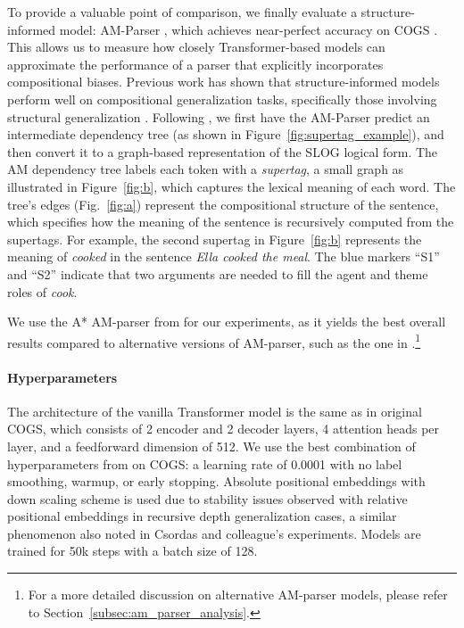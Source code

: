 To provide a valuable point of comparison, we finally evaluate a structure-informed model: AM-Parser \citep{groschwitz-etal-2018-amr}, which achieves near-perfect accuracy on COGS \citep{weissenhorn-etal-2022-compositional}. This allows us to measure how closely Transformer-based models can approximate the performance of a parser that explicitly incorporates compositional biases. Previous work has shown that structure-informed models perform well on compositional generalization tasks, specifically those involving structural generalization \citep{yao-koller-2022-structural}. Following \citet{weissenhorn-etal-2022-compositional}, we first have the AM-Parser predict an intermediate dependency tree (as shown in Figure~\ref{fig:supertag_example}), and then convert it to a graph-based representation of the SLOG logical form. The AM dependency tree labels each token with a \emph{supertag}, a small graph as illustrated in Figure~\ref{fig:b}, which captures the lexical meaning of each word. The tree's edges (Fig.~\ref{fig:a}) represent the compositional structure of the sentence, which specifies how the meaning of the sentence is recursively computed from the supertags.
For example, the second supertag in Figure~\ref{fig:b} represents the meaning of \textit{cooked} in the sentence \textit{Ella cooked the meal}. The blue markers ``S1'' and ``S2'' indicate that two arguments are needed to fill the agent and theme roles of \textit{cook}.

We use the A* AM-parser from \citet{lindemann-etal-2020-fast} for our experiments, as it yields the best overall results compared to alternative versions of AM-parser, such as the one in \citet{groschwitz-etal-2018-amr}.\footnote{For a more detailed discussion on alternative AM-parser models, please refer to Section~\ref{subsec:am_parser_analysis}.}

\vspace{-0.5\baselineskip}
\paragraph{Hyperparameters} 
The architecture of the vanilla Transformer model is the same as in original COGS, which consists of 2 encoder and 2 decoder layers, 4 attention heads per layer, and a feedforward dimension of 512. We use the best combination of hyperparameters from \citet{csordas-etal-2021-devil} on COGS: a learning rate of 0.0001 with no label smoothing, warmup, or early stopping. Absolute positional embeddings with down scaling scheme \citep{he2015delving,csordas-etal-2021-devil} is used due to stability issues observed with relative positional embeddings in recursive depth generalization cases, a similar phenomenon also noted in Csordas and colleague's experiments. Models are trained for 50k steps with a batch size of 128.

